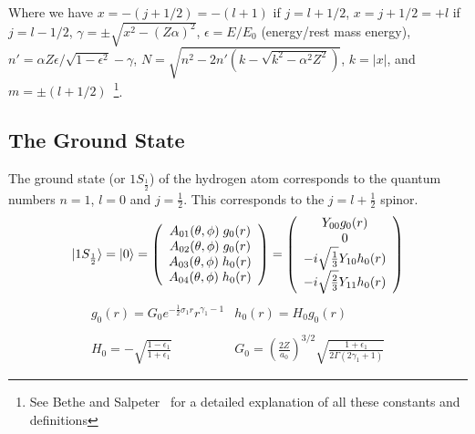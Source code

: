    Where we have $x = -(j+1/2)=-(l+1)$ if $j=l+1/2$, $x=j+1/2=+l$ if $j=l-1/2$,
    $\gamma = \pm\sqrt{x^2 - (Z\alpha)^2}$, $\epsilon = E/E_0$ (energy/rest mass
    energy), $n' = \alpha Z \epsilon/\sqrt{1 - \epsilon^2} - \gamma$,
    $N = \sqrt{n^2 - 2n'(k - \sqrt{k^2 - \alpha^2 Z^2})}$, $k = |x|$, and
    $m = \pm(l+1/2)$~\footnote{See Bethe and Salpeter~\cite{Bethe-Salpeter} for a
    detailed explanation of all these constants and definitions}.

    \subsection{The Ground State}
    The ground state (or $1S_{\frac{1}{2}}$) of the hydrogen atom corresponds to
    the quantum numbers $n=1$, $l=0$ and $j=\frac{1}{2}$. This corresponds to
    the $j = l+ \frac{1}{2}$ spinor.
    \begin{equation} \label{eq:dirac-ground}
	|1S_{\frac{1}{2}} \rangle = |0 \rangle = 
		\left(
			\begin{array}{c}
				A_{01}(\theta,\phi) \; g_0(r) \\
				A_{02}(\theta,\phi) \; g_0(r) \\
				A_{03}(\theta,\phi) \; h_0(r) \\
				A_{04}(\theta,\phi) \; h_0(r)
			\end{array}
		\right)
		=
		\left(
			\begin{array}{c}
				Y_{00} 	g_0(r)	\\
				0	 			\\
				-i \sqrt{\frac{1}{3}} Y_{10} h_0(r) \\
				-i \sqrt{\frac{2}{3}} Y_{11} h_0(r)
			\end{array}
		\right)
    \end{equation}
    \begin{equation} \label{eq:dirac-radial}
    \begin{array}{cc}
		g_0(r) = G_0 e^{-\frac{1}{2} \sigma_1 r} r^{\gamma_1 - 1} &
		h_0(r) = H_0 g_0(r) 
    \\
    \\
	    H_0  =  - \sqrt{ \frac{1 - \epsilon_1}{1 + \epsilon_1} }	&
	    G_0  =  \left( \frac{2Z}{a_0} \right)^{3/2} 
		  	   	\sqrt{\frac{1 + \epsilon_1}{2 \Gamma(2\gamma_1 + 1) }}
    \end{array}
    \end{equation}
